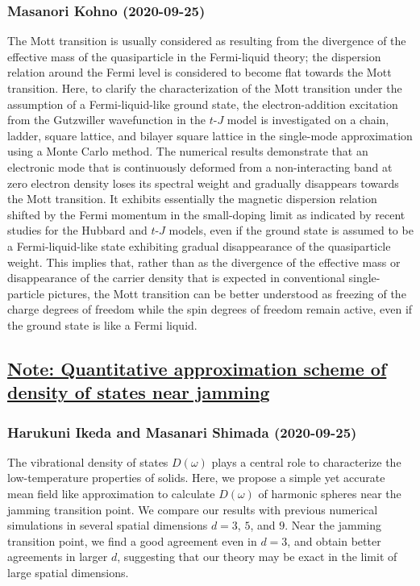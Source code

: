 \subsubsection*{Masanori Kohno (2020-09-25)}
The Mott transition is usually considered as resulting from the divergence of
the effective mass of the quasiparticle in the Fermi-liquid theory; the
dispersion relation around the Fermi level is considered to become flat towards
the Mott transition. Here, to clarify the characterization of the Mott
transition under the assumption of a Fermi-liquid-like ground state, the
electron-addition excitation from the Gutzwiller wavefunction in the $t$-$J$
model is investigated on a chain, ladder, square lattice, and bilayer square
lattice in the single-mode approximation using a Monte Carlo method. The
numerical results demonstrate that an electronic mode that is continuously
deformed from a non-interacting band at zero electron density loses its
spectral weight and gradually disappears towards the Mott transition. It
exhibits essentially the magnetic dispersion relation shifted by the Fermi
momentum in the small-doping limit as indicated by recent studies for the
Hubbard and $t$-$J$ models, even if the ground state is assumed to be a
Fermi-liquid-like state exhibiting gradual disappearance of the quasiparticle
weight. This implies that, rather than as the divergence of the effective mass
or disappearance of the carrier density that is expected in conventional
single-particle pictures, the Mott transition can be better understood as
freezing of the charge degrees of freedom while the spin degrees of freedom
remain active, even if the ground state is like a Fermi liquid.

\subsection*{\href{http://arxiv.org/abs/2009.12060v1}{Note: Quantitative approximation scheme of density of states near  jamming}}
\subsubsection*{Harukuni Ikeda and Masanari Shimada (2020-09-25)}
The vibrational density of states $D(\omega)$ plays a central role to
characterize the low-temperature properties of solids. Here, we propose a
simple yet accurate mean field like approximation to calculate $D(\omega)$ of
harmonic spheres near the jamming transition point. We compare our results with
previous numerical simulations in several spatial dimensions $d=3$, $5$, and
$9$. Near the jamming transition point, we find a good agreement even in $d=3$,
and obtain better agreements in larger $d$, suggesting that our theory may be
exact in the limit of large spatial dimensions.

